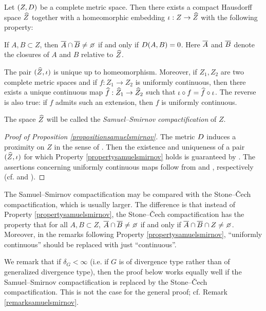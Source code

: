 \begin{proposition}
\label{propositionsamuelsmirnov}
Let $(Z,D)$ be a complete metric space. Then there exists a compact Hausdorff space $\widehat Z$ together with a homeomorphic embedding $\iota:Z\to\widehat Z$ with the following property:
\begin{property}
\label{propertysamuelsmirnov}
\narrower
If $A,B\subset Z$, then $\cl A\cap \cl B \neq \emptyset$ if and only if $D(A,B) = 0$. Here $\overline A$ and $\overline B$ denote the closures of $A$ and $B$ relative to $\widehat Z$.
\end{property}
\noindent The pair $(\widehat Z,\iota)$ is unique up to homeomorphism. Moreover, if $Z_1,Z_2$ are two complete metric spaces and if $f:Z_1\to Z_2$ is uniformly continuous, then there exists a unique continuous map $\fhat:\what Z_1\to \what Z_2$ such that $\iota\circ f = \fhat\circ \iota$. The reverse is also true: if $f$ admits such an extension, then $f$ is uniformly continuous.
\end{proposition}
The space $\widehat Z$ will be called the \emph{Samuel--Smirnov compactification} of $Z$.
\begin{proof}[Proof of Proposition \ref{propositionsamuelsmirnov}]
The metric $D$ induces a proximity on $Z$ in the sense of \cite[Definition 1.7]{NaimpallyWarrack}. Then the existence and uniqueness of a pair $(\widehat Z,\iota)$ for which Property \ref{propertysamuelsmirnov} holds is guaranteed by \cite[Theorem 7.7]{NaimpallyWarrack}. The assertions concerning uniformly continuous maps follow from \cite[Theorem 7.10]{NaimpallyWarrack} and \cite[Theorem 4.4]{NaimpallyWarrack}, respectively (cf. \cite[Remark 4.8]{NaimpallyWarrack} and \cite[Definition 4.10]{NaimpallyWarrack}).
\end{proof}
\begin{remark}
\label{remarkstonecech}
The Samuel--Smirnov compactification may be compared with the Stone--\v Cech compactification, which is usually larger. The difference is that instead of Property \ref{propertysamuelsmirnov}, the Stone--\v Cech compactification has the property that for all $A,B\subset Z$, $\cl A\cap \cl B \neq \emptyset$ if and only if $\cl A\cap \cl B \cap Z \neq \emptyset$. Moreover, in the remarks following Property \ref{propertysamuelsmirnov}, ``uniformly continuous'' should be replaced with just ``continuous''.

We remark that if $\delta_G < \infty$ (i.e. if $G$ is of divergence type rather than of generalized divergence type), then the proof below works equally well if the Samuel--Smirnov compactification is replaced by the Stone--\v Cech compactification. This is not the case for the general proof; cf. Remark \ref{remarksamuelsmirnov}.
\end{remark}

